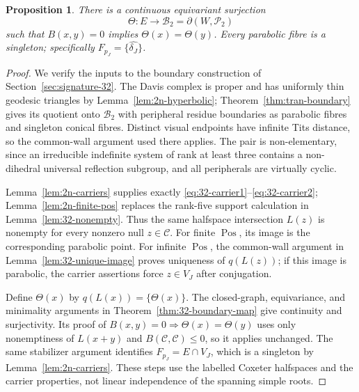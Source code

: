 \documentclass[11pt,reqno]{amsart}
\theoremstyle{plain}
\newtheorem{proposition}[theorem]{Proposition}
\theoremstyle{definition}
\theoremstyle{remark}
\numberwithin{equation}{section}
\DeclareMathOperator{\Pos}{Pos}
\begin{document}
\begin{proposition}\label{prop:2n-boundary}
There is a continuous equivariant surjection
\[
 \Theta:E\longrightarrow\mathcal B_2=\partial(W,\mathcal P_2)
\]
such that $B(x,y)=0$ implies $\Theta(x)=\Theta(y)$. Every parabolic fibre is a singleton; specifically $F_{p_J}=\{\widehat{\delta_J}\}$.
\end{proposition}
\begin{proof}
We verify the inputs to the boundary construction of Section~\ref{sec:signature-32}. The Davis complex is proper and has uniformly thin geodesic triangles by Lemma~\ref{lem:2n-hyperbolic}; Theorem~\ref{thm:tran-boundary} gives its quotient onto $\mathcal B_2$ with peripheral residue boundaries as parabolic fibres and singleton conical fibres. Distinct visual endpoints have infinite Tits distance, so the common-wall argument used there applies. The pair is non-elementary, since an irreducible indefinite system of rank at least three contains a non-dihedral universal reflection subgroup, and all peripherals are virtually cyclic.

Lemma~\ref{lem:2n-carriers} supplies exactly \eqref{eq:32-carrier1}--\eqref{eq:32-carrier2}; Lemma~\ref{lem:2n-finite-pos} replaces the rank-five support calculation in Lemma~\ref{lem:32-nonempty}. Thus the same halfspace intersection $L(z)$ is nonempty for every nonzero null $z\in\mathcal C$. For finite $\Pos$, its image is the corresponding parabolic point. For infinite $\Pos$, the common-wall argument in Lemma~\ref{lem:32-unique-image} proves uniqueness of $q(L(z))$; if this image is parabolic, the carrier assertions force $z\in V_J$ after conjugation.

Define $\Theta(x)$ by $q(L(x))=\{\Theta(x)\}$. The closed-graph, equivariance, and minimality arguments in Theorem~\ref{thm:32-boundary-map} give continuity and surjectivity. Its proof of $B(x,y)=0\Rightarrow\Theta(x)=\Theta(y)$ uses only nonemptiness of $L(x+y)$ and $B(\mathcal C,\mathcal C)\leq0$, so it applies unchanged. The same stabilizer argument identifies $F_{p_J}=E\cap V_J$, which is a singleton by Lemma~\ref{lem:2n-carriers}. These steps use the labelled Coxeter halfspaces and the carrier properties, not linear independence of the spanning simple roots.
\end{proof}
\end{document}
